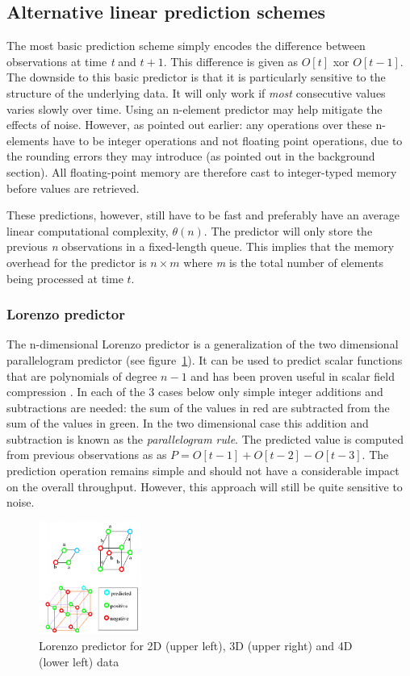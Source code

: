  \subsection{Alternative linear prediction schemes}
  The most basic prediction scheme simply encodes the difference between observations at time \textit{t} and $t+1$. This difference is given as $O[t]$ xor $O[t-1]$. The 
  downside to this basic predictor is that it is particularly sensitive to the structure of the underlying data. It will only work if \emph{most} consecutive values varies 
  slowly over time. Using an n-element predictor may help mitigate the effects of noise. However, as pointed out earlier: any operations over these n-elements have to be integer 
  operations and not floating point operations, due to the rounding errors they may introduce (as pointed out in the background section). All floating-point memory are therefore 
  cast to integer-typed memory before values are retrieved.
  
  These predictions, however, still have to be fast and preferably have an average linear computational complexity, $\theta(n)$. The predictor will only 
  store the previous \textit{n} observations in a fixed-length queue. This implies that the memory overhead for the predictor is $n\times m$ where \textit{m} is 
  the total number of elements being processed at time $t$.
 \subsubsection{Lorenzo predictor}
 The n-dimensional Lorenzo predictor is a generalization of the two dimensional parallelogram predictor (see figure~\ref{LORENZO}). It can be used to predict scalar 
 functions that are polynomials of degree $n - 1$ and has been proven useful in scalar field compression \cite{CGF:CGF681}. In each of the 3 cases below only simple
 integer additions and subtractions are needed: the sum of the values in red are subtracted from the sum of the values in green. In the two dimensional case this 
 addition and subtraction is known as the \textit{parallelogram rule}. The predicted value is computed from previous observations as as $P = O[t-1] + O[t-2] - O[t-3]$.
 The prediction operation remains simple and should not have a considerable impact on the overall throughput. However, this approach will still be quite sensitive to noise.
  \begin{figure}[h!]
  \begin{mdframed}
    \centering
    \includegraphics[width=0.3\textwidth]{lorenzo.png}
    \caption{Lorenzo predictor for 2D (upper left), 3D (upper right) and 4D (lower left) data \cite{CGF:CGF681}}
    \label{LORENZO}
  \end{mdframed}
  \end{figure} 
